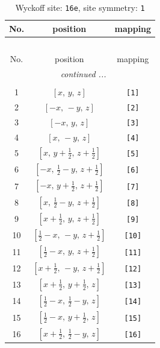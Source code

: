 \documentclass[fleqn,8pt]{jsarticle}
\begin{document}
\begin{longtable}{ccc}
\caption{Wyckoff site: {\tt 16e}, site symmetry: {\tt 1}}
 \\
 \hline \hline
No. & position & mapping \\ \hline \endfirsthead

\multicolumn{2}{l}{\tablename\ \thetable{}} \\
 \hline \hline
No. & position & mapping \\ \hline \endhead

 \hline \hline
\multicolumn{2}{r}{\footnotesize\it continued ...} \\ \endfoot

 \hline \hline
\multicolumn{2}{r}{} \\ \endlastfoot

1 & $\left[ x,\, y,\, z \right]$ & {\tt [1]} \\ \hline
2 & $\left[ - x,\, - y,\, z \right]$ & {\tt [2]} \\ \hline
3 & $\left[ - x,\, y,\, z \right]$ & {\tt [3]} \\ \hline
4 & $\left[ x,\, - y,\, z \right]$ & {\tt [4]} \\ \hline
5 & $\left[ x,\, y + \frac{1}{2},\, z + \frac{1}{2} \right]$ & {\tt [5]} \\ \hline
6 & $\left[ - x,\, \frac{1}{2} - y,\, z + \frac{1}{2} \right]$ & {\tt [6]} \\ \hline
7 & $\left[ - x,\, y + \frac{1}{2},\, z + \frac{1}{2} \right]$ & {\tt [7]} \\ \hline
8 & $\left[ x,\, \frac{1}{2} - y,\, z + \frac{1}{2} \right]$ & {\tt [8]} \\ \hline
9 & $\left[ x + \frac{1}{2},\, y,\, z + \frac{1}{2} \right]$ & {\tt [9]} \\ \hline
10 & $\left[ \frac{1}{2} - x,\, - y,\, z + \frac{1}{2} \right]$ & {\tt [10]} \\ \hline
11 & $\left[ \frac{1}{2} - x,\, y,\, z + \frac{1}{2} \right]$ & {\tt [11]} \\ \hline
12 & $\left[ x + \frac{1}{2},\, - y,\, z + \frac{1}{2} \right]$ & {\tt [12]} \\ \hline
13 & $\left[ x + \frac{1}{2},\, y + \frac{1}{2},\, z \right]$ & {\tt [13]} \\ \hline
14 & $\left[ \frac{1}{2} - x,\, \frac{1}{2} - y,\, z \right]$ & {\tt [14]} \\ \hline
15 & $\left[ \frac{1}{2} - x,\, y + \frac{1}{2},\, z \right]$ & {\tt [15]} \\ \hline
16 & $\left[ x + \frac{1}{2},\, \frac{1}{2} - y,\, z \right]$ & {\tt [16]} \\
\end{longtable}
\end{document}
